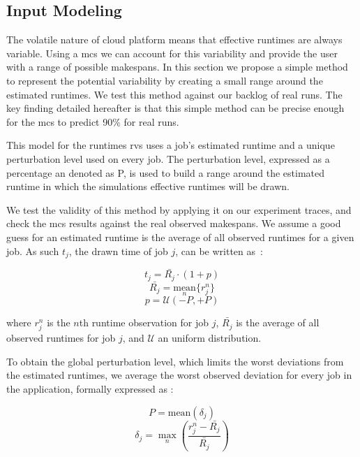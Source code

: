 \documentclass[10pt,conference,compsocconf]{IEEEtran}
\begin{document}
\subsection{Input Modeling}\label{sec:im}

The volatile nature of cloud platform means that effective runtimes are always
variable. Using a \ac{mcs} we can account for this variability and provide the
user with a range of possible makespans. In this section we propose a simple
method to represent the potential variability by creating a small range around
the estimated runtimes. We test this method against our backlog of real runs.
The key finding detailed hereafter is that this simple method can be precise
enough for the \ac{mcs} to predict 90\% for real runs.

This model for the runtimes \acp{rv} uses a job's estimated runtime and a unique
perturbation level used on every job. The perturbation level, expressed as a
percentage an denoted as P, is used to build a range around the estimated
runtime in which the simulations effective runtimes will be drawn. 

We test the validity of this method by applying it on our experiment traces, and
check the \ac{mcs} results against the real observed makespans. We assume a good
guess for an estimated runtime is the average of all observed runtimes for a
given job. As such $t_j$, the drawn time of job $j$, can be written as~:

\begin{equation}
	t_j = \bar{R_j} \cdot (1 + p)
	\label{eq:t}
\end{equation}
\begin{equation}
	\bar{R_j} = \underset{n}{\textrm{mean}}\{r_j^n\}
\end{equation}
\begin{equation}
	p = \mathcal{U}(-P,+P)
	\label{eq:r}
\end{equation}

where $r_j^n$ is the $n$th runtime observation for job $j$, $\bar{R_j}$ is the
average of all observed runtimes for job $j$, and $\mathcal{U}$ an uniform distribution.

To obtain the global perturbation level, which limits the worst deviations from
the estimated runtimes, we average the worst observed deviation for every job in
the application, formally expressed as :

\begin{equation}
P = \textrm{mean}(\delta{}_j)
\label{eq:P}
\end{equation}
\begin{equation}
\delta{}_j =
\max_n\left(\frac{r_j^n-\bar{R_j}}{\bar{R_j}}\right)
\label{eq:d}
\end{equation}
\end{document}
